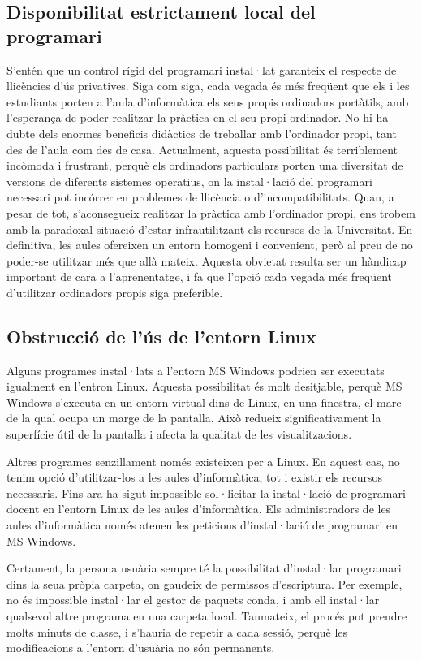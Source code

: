 \documentclass[a4paper,12pt]{article}
\begin{document}
\subsection{Disponibilitat estrictament local del programari}
S'entén que un control rígid del programari instal·lat 
garanteix el respecte de llicències d'ús privatives. Siga com siga, cada vegada és més
freqüent que els i les estudiants porten a l'aula d'informàtica els seus propis ordinadors
portàtils, amb l'esperança de poder realitzar la pràctica en el seu propi ordinador.
No hi ha dubte dels enormes beneficis didàctics de
treballar amb l'ordinador propi, tant des de l'aula com des de casa. Actualment,
aquesta possibilitat és terriblement incòmoda i frustrant, perquè els ordinadors
particulars porten una diversitat de versions de diferents sistemes operatius, on la
instal·lació del programari necessari pot incórrer en problemes de llicència o
d'incompatibilitats. Quan, a pesar de tot, s'aconsegueix realitzar la pràctica amb
l'ordinador propi, ens trobem amb la paradoxal situació d'estar infrautilitzant els
recursos de la Universitat. En definitiva, les aules ofereixen un entorn homogeni i
convenient, però al preu de no poder-se utilitzar més que allà mateix. Aquesta obvietat
resulta ser un hàndicap important de cara a l'aprenentatge, i fa que l'opció cada vegada
més freqüent d'utilitzar ordinadors propis siga preferible.

\subsection{Obstrucció de l'ús de l'entorn Linux}
Alguns programes instal·lats a l'entorn MS Windows podrien ser executats igualment en
l'entron Linux. Aquesta possibilitat és molt desitjable, perquè MS Windows s'executa
en un entorn virtual dins de Linux, en una finestra, el marc de la qual ocupa un marge
de la pantalla. Això redueix significativament la superfície útil de la pantalla i
afecta la qualitat de les visualitzacions.

Altres programes senzillament només existeixen per a Linux. En aquest cas, no tenim
opció d'utilitzar-los a les aules d'informàtica, tot i existir els recursos necessaris.
Fins ara ha sigut impossible sol·licitar la instal·lació
de programari docent en l'entorn Linux de les aules d'informàtica. Els administradors
de les aules d'informàtica només atenen les peticions d'instal·lació de programari en
MS Windows.

Certament, la persona usuària sempre té la possibilitat d'instal·lar programari dins la seua
pròpia carpeta, on gaudeix de permissos d'escriptura. Per exemple, no és impossible
instal·lar el gestor de paquets \textsf{conda}, i amb ell instal·lar qualsevol altre programa en
una carpeta local. Tanmateix, el procés pot prendre molts minuts de classe, i s'hauria
de repetir a cada sessió, perquè les modificacions a l'entorn d'usuària no són permanents.
\end{document}

